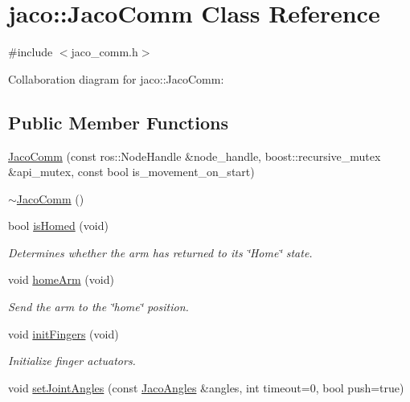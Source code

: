 \hypertarget{classjaco_1_1_jaco_comm}{}\section{jaco\+:\+:Jaco\+Comm Class Reference}
\label{classjaco_1_1_jaco_comm}


{\ttfamily \#include $<$jaco\+\_\+comm.\+h$>$}



Collaboration diagram for jaco\+:\+:Jaco\+Comm\+:
\subsection*{Public Member Functions}
\begin{DoxyCompactItemize}
\item 
\hyperlink{classjaco_1_1_jaco_comm_acdf234ee7f30cf5ead4f41beb3481521}{Jaco\+Comm} (const ros\+::\+Node\+Handle \&node\+\_\+handle, boost\+::recursive\+\_\+mutex \&api\+\_\+mutex, const bool is\+\_\+movement\+\_\+on\+\_\+start)
\item 
\hyperlink{classjaco_1_1_jaco_comm_a94db89ce398a131d5dd6985a7725f495}{$\sim$\+Jaco\+Comm} ()
\item 
bool \hyperlink{classjaco_1_1_jaco_comm_a0e7d5984a2c6ed956da7e07e6c97ba5f}{is\+Homed} (void)
\begin{DoxyCompactList}\small\item\em Determines whether the arm has returned to its \char`\"{}\+Home\char`\"{} state. \end{DoxyCompactList}\item 
void \hyperlink{classjaco_1_1_jaco_comm_a38c69b22bc293afd3f27eff9179dec4c}{home\+Arm} (void)
\begin{DoxyCompactList}\small\item\em Send the arm to the \char`\"{}home\char`\"{} position. \end{DoxyCompactList}\item 
void \hyperlink{classjaco_1_1_jaco_comm_a787f049f83d8f5fa5a7c86ee6a1d0a11}{init\+Fingers} (void)
\begin{DoxyCompactList}\small\item\em Initialize finger actuators. \end{DoxyCompactList}\item 
void \hyperlink{classjaco_1_1_jaco_comm_ad53fa0c190d41da8430de2e9bf997f05}{set\+Joint\+Angles} (const \hyperlink{classjaco_1_1_jaco_angles}{Jaco\+Angles} \&angles, int timeout=0, bool push=true)

\end{DoxyCompactItemize}
